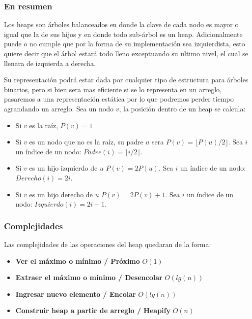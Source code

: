 \documentclass[10pt, a4paper]{report}
\begin{document}

\subsubsection{En resumen}

Los heaps son \'arboles balanceados en donde la clave de cada nodo es mayor o igual que la de sus hijos y en donde todo sub-\'arbol es un heap. Adicionalmente puede o no cumple que por la forma de su implementaci\'on sea izquierdista, esto quiere decir que el \'arbol estar\'a todo lleno exceptuando su ultimo nivel, el cual se llenara de izquierda a derecha.

Su representaci\'on podr\'a estar dada por cualquier tipo de estructura para \'arboles binarios, pero si bien sera mas eficiente si se lo representa en un arreglo, pasaremos a una representaci\'on est\'atica por lo que podremos perder tiempo agrandando un arreglo. Sea un nodo $v$, la posici\'on dentro de un heap se calcula:

\begin{itemize}
 \item Si $v$ es la ra\'iz, $P(v) = 1$
 \item Si $v$ es un nodo que no es la ra\'iz, su padre $u$ sera $P(v) = \lfloor P(u)/2\rfloor$. Sea $i$ un \'indice de un nodo: $Padre(i) = \lfloor i/2\rfloor$.
 \item Si $v$ es un hijo izquierdo de $u$ $P(v) = 2P(u)$. Sea $i$ un \'indice de un nodo: $Derecho(i) = 2i$.
 \item Si $v$ es un hijo derecho de $u$ $P(v) = 2P(v)+1$. Sea $i$ un \'indice de un nodo: $Izquierdo(i) = 2i+1$.
\end{itemize}

\subsubsection{Complejidades}
Las complejidades de las operaciones del heap quedaran de la forma:

\begin{itemize}
 \item \textbf{Ver el m\'aximo o m\'inimo / Pr\'oximo} $O(1)$
 \item \textbf{Extraer el m\'aximo o m\'inimo / Desencolar} $O(lg(n))$
 \item \textbf{Ingresar nuevo elemento / Encolar} $O(lg(n))$
 \item \textbf{Construir heap a partir de arreglo / Heapify} $O(n)$
\end{itemize}
\end{document}
